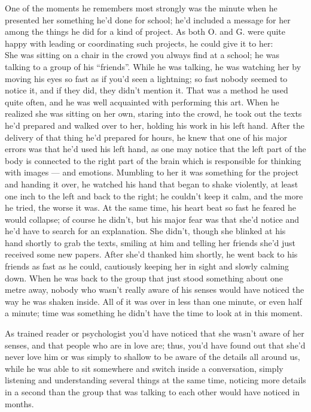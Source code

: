 One of the moments he remembers most strongly was the minute when he presented her something he'd done for school; he'd included a message for her among the things he did for a kind of project. As both O. and G. were quite happy with leading or coordinating such projects, he could give it to her:\\
She was sitting on a chair in the crowd you always find at a school; he was talking to a group of his \enquote{friends}. While he was talking, he was watching her by moving his eyes so fast as if you'd seen a lightning; so fast nobody seemed to notice it, and if they did, they didn't mention it. That was a method he used quite often, and he was well acquainted with performing this art. When he realized she was sitting on her own, staring into the crowd, he took out the texts he'd prepared and walked over to her, holding his work in his left hand. After the delivery of that thing he'd prepared for hours, he knew that one of his major errors was that he'd used his left hand, as one may notice that the left part of the body is connected to the right part of the brain which is responsible for thinking with images --- and emotions. Mumbling to her it was something for the project and handing it over, he watched his hand that began to shake violently, at least one inch to the left and back to the right; he couldn't keep it calm, and the more he tried, the worse it was. At the same time, his heart beat so fast he feared he would collapse; of course he didn't, but his major fear was that she'd notice and he'd have to search for an explanation. She didn't, though she blinked at his hand shortly to grab the texts, smiling at him and telling her friends she'd just received some new papers. After she'd thanked him shortly, he went back to his friends as fast as he could, cautiously keeping her in sight and slowly calming down. When he was back to the group that just stood something about one metre away, nobody who wasn't really aware of his senses would have noticed the way he was shaken inside. All of it was over in less than one minute, or even half a minute; time was something he didn't have the time to look at in this moment.

As trained reader or psychologist you'd have noticed that she wasn't aware of her senses, and that people who are in love are; thus, you'd have found out that she'd never love him or was simply to shallow to be aware of the details all around us, while he was able to sit somewhere and switch inside a conversation, simply listening and understanding several things at the same time, noticing more details in a second than the group that was talking to each other would have noticed in months.

